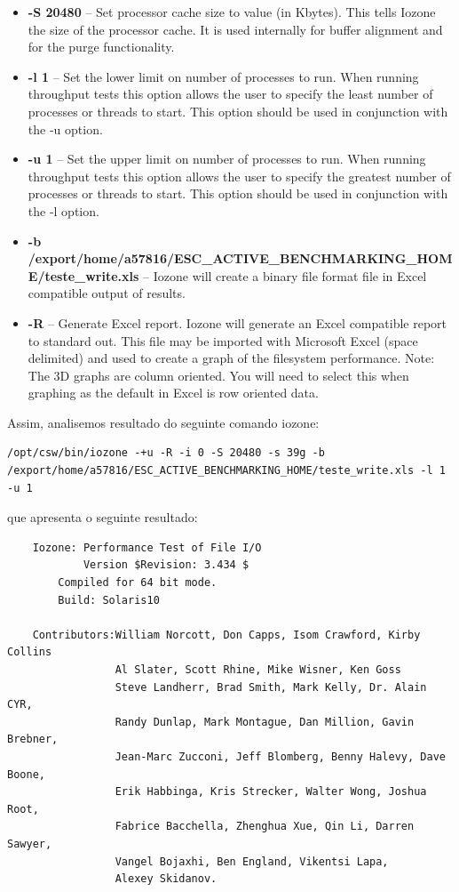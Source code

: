 \documentclass[a4paper]{article}
\begin{document}
{\begin{itemize}
\item \textbf{-S 20480} -- Set processor cache size to value (in Kbytes). This tells Iozone the size of the processor cache. It is used internally for buffer alignment and for the purge functionality.

\item \textbf{-l 1 } -- Set the lower limit on number of processes to run. When running throughput tests this option allows the user to specify the least number of processes or threads to start. This option should be used in conjunction with the -u option.

\item \textbf{-u 1 } -- Set the upper limit on number of processes to run. When running throughput tests this option allows the user to specify the greatest number of processes or threads to start. This option should be used in conjunction with the -l option.

\item \textbf{ -b /export/home/a57816/ESC\_ACTIVE\_BENCHMARKING\_HOME/teste\_write.xls } -- Iozone will create a binary file format file in Excel compatible output of results.

\item \textbf{-R} -- Generate Excel report. Iozone will generate an Excel compatible report to standard out. This file may be imported with Microsoft Excel (space delimited) and used to create a graph of the filesystem performance. Note: The 3D graphs are column oriented. You will need to select this when graphing as the default in Excel is row oriented data.
\end{itemize}

Assim, analisemos resultado  do seguinte comando iozone:
\begin{lstlisting}[style=command]
/opt/csw/bin/iozone -+u -R -i 0 -S 20480 -s 39g -b /export/home/a57816/ESC_ACTIVE_BENCHMARKING_HOME/teste_write.xls -l 1 -u 1 
\end{lstlisting}
   
que apresenta o seguinte resultado:
\begin{lstlisting}
	Iozone: Performance Test of File I/O
	        Version $Revision: 3.434 $
		Compiled for 64 bit mode.
		Build: Solaris10 

	Contributors:William Norcott, Don Capps, Isom Crawford, Kirby Collins
	             Al Slater, Scott Rhine, Mike Wisner, Ken Goss
	             Steve Landherr, Brad Smith, Mark Kelly, Dr. Alain CYR,
	             Randy Dunlap, Mark Montague, Dan Million, Gavin Brebner,
	             Jean-Marc Zucconi, Jeff Blomberg, Benny Halevy, Dave Boone,
	             Erik Habbinga, Kris Strecker, Walter Wong, Joshua Root,
	             Fabrice Bacchella, Zhenghua Xue, Qin Li, Darren Sawyer,
	             Vangel Bojaxhi, Ben England, Vikentsi Lapa,
	             Alexey Skidanov.


\end{lstlisting}}
\end{document}
